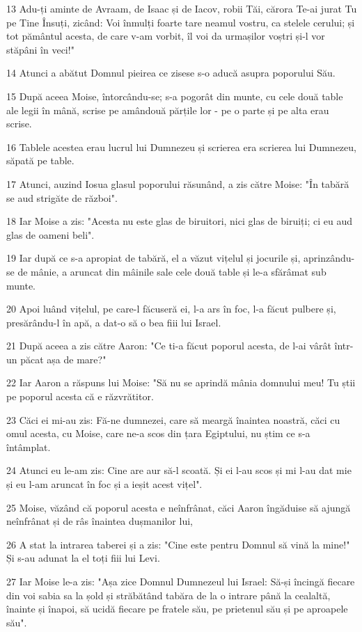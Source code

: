 \par 13 Adu-ți aminte de Avraam, de Isaac și de Iacov, robii Tăi, cărora Te-ai jurat Tu pe Tine Însuți, zicând: Voi înmulți foarte tare neamul vostru, ca stelele cerului; și tot pământul acesta, de care v-am vorbit, îl voi da urmașilor voștri și-l vor stăpâni în veci!"
\par 14 Atunci a abătut Domnul pieirea ce zisese s-o aducă asupra poporului Său.
\par 15 După aceea Moise, întorcându-se; s-a pogorât din munte, cu cele două table ale legii în mână, scrise pe amândouă părțile lor - pe o parte și pe alta erau scrise.
\par 16 Tablele acestea erau lucrul lui Dumnezeu și scrierea era scrierea lui Dumnezeu, săpată pe table.
\par 17 Atunci, auzind Iosua glasul poporului răsunând, a zis către Moise: "În tabără se aud strigăte de război".
\par 18 Iar Moise a zis: "Acesta nu este glas de biruitori, nici glas de biruiți; ci eu aud glas de oameni beli".
\par 19 Iar după ce s-a apropiat de tabără, el a văzut vițelul și jocurile și, aprinzându-se de mânie, a aruncat din mâinile sale cele două table și le-a sfărâmat sub munte.
\par 20 Apoi luând vițelul, pe care-l făcuseră ei, l-a ars în foc, l-a făcut pulbere și, presărându-l în apă, a dat-o să o bea fiii lui Israel.
\par 21 După aceea a zis către Aaron: "Ce ti-a făcut poporul acesta, de l-ai vârât într-un păcat așa de mare?"
\par 22 Iar Aaron a răspuns lui Moise: "Să nu se aprindă mânia domnului meu! Tu știi pe poporul acesta că e răzvrătitor.
\par 23 Căci ei mi-au zis: Fă-ne dumnezei, care să meargă înaintea noastră, căci cu omul acesta, cu Moise, care ne-a scos din țara Egiptului, nu știm ce s-a întâmplat.
\par 24 Atunci eu le-am zis: Cine are aur să-l scoată. Și ei l-au scos și mi l-au dat mie și eu l-am aruncat în foc și a ieșit acest vițel".
\par 25 Moise, văzând că poporul acesta e neînfrânat, căci Aaron îngăduise să ajungă neînfrânat și de râs înaintea dușmanilor lui,
\par 26 A stat la intrarea taberei și a zis: "Cine este pentru Domnul să vină la mine!" Și s-au adunat la el toți fiii lui Levi.
\par 27 Iar Moise le-a zis: "Așa zice Domnul Dumnezeul lui Israel: Să-și încingă fiecare din voi sabia sa la șold și străbătând tabăra de la o intrare până la cealaltă, înainte și înapoi, să ucidă fiecare pe fratele său, pe prietenul său și pe aproapele său".
